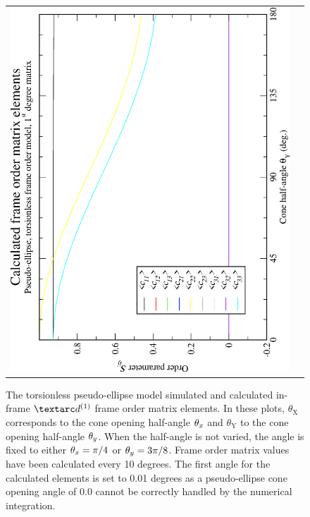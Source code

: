 \begin{figure}
\begin{tabular}{@{}cc@{}}
    \includegraphics[width=.35\textwidth,angle=270]{images/frame_order_matrix/Sij_pseudo-ellipse_torsionless_in_frame_theta_y_calc.eps} \\
  \end{tabular}
  \caption[Torsionless pseudo-ellipse simulated and calculated in-frame $\FOone$ elements.]{
    The torsionless pseudo-ellipse model simulated and calculated in-frame $\FOone$ frame order matrix elements.
    In these plots, $\theta_\textrm{X}$ corresponds to the cone opening half-angle $\theta_x$ and $\theta_\textrm{Y}$ to the cone opening half-angle $\theta_y$.
    When the half-angle is not varied, the angle is fixed to either $\theta_x = \pi/4$ or $\theta_y = 3\pi/8$.
    Frame order matrix values have been calculated every 10 degrees.
    The first angle for the calculated elements is set to 0.01 degrees as a pseudo-ellipse cone opening angle of 0.0 cannot be correctly handled by the numerical integration.
  }
  \label{fig: simulated and calculated in-frame 1st degree pseudo-ellipse, torsionless frame order}
\end{figure}

